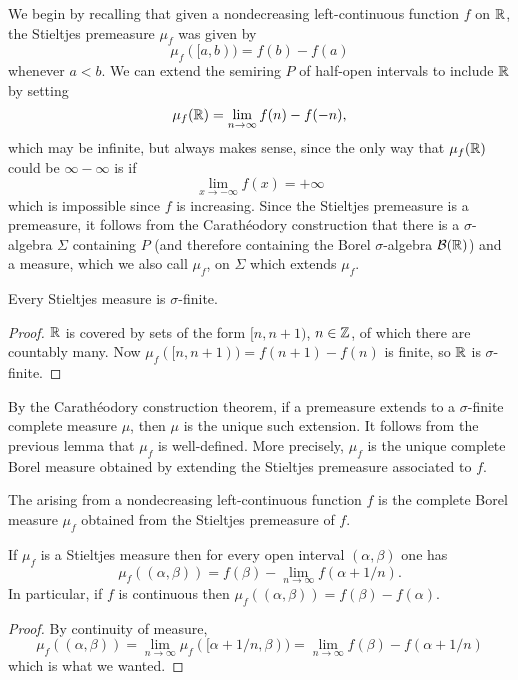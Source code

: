\begin{subsec}
We begin by recalling that given a nondecreasing left-continuous function $f$ on $\mathbb{R}$, the Stieltjes premeasure $\mu_f$ was given by
\[\mu_f([a, b)) = f(b) - f(a)\]
whenever $a < b$.
We can extend the semiring $P$ of half-open intervals to include $\mathbb{R}$ by setting
\[\mu_f(\mathbb{R}) = \lim_{n \to \infty} f(n) - f(-n),\]
which may be infinite, but always makes sense, since the only way that $\mu_f(\mathbb{R})$ could be $\infty - \infty$ is if
\[\lim_{x \to -\infty} f(x) = +\infty\]
which is impossible since $f$ is increasing.
Since the Stieltjes premeasure is a premeasure, it follows from the Carathéodory construction that there is a $\sigma$-algebra $\Sigma$ containing $P$ (and therefore containing the Borel $\sigma$-algebra $\mathcal B(\mathbb{R})$) and a measure, which we also call $\mu_f$, on $\Sigma$ which extends $\mu_f$.
\end{subsec}

\begin{lemma}
Every Stieltjes measure is $\sigma$-finite.
\end{lemma}
\begin{proof}
$\mathbb{R}$ is covered by sets of the form $[n, n + 1)$, $n \in \mathbb{Z}$, of which there are countably many.
Now $\mu_f([n, n + 1)) = f(n+1) - f(n)$ is finite, so $\mathbb{R}$ is $\sigma$-finite.
\end{proof}

\begin{subsec}
By the Carathéodory construction theorem, if a premeasure extends to a $\sigma$-finite complete measure $\mu$, then $\mu$ is the unique such extension.
It follows from the previous lemma that $\mu_f$ is well-defined.
More precisely, $\mu_f$ is the unique complete Borel measure obtained by extending the Stieltjes premeasure associated to $f$.
\end{subsec}

\begin{definition}
The  arising from a nondecreasing left-continuous function $f$ is the complete Borel measure $\mu_f$ obtained from the Stieltjes premeasure of $f$.
\end{definition}

\begin{lemma}
If $\mu_f$ is a Stieltjes measure then for every open interval $(\alpha, \beta)$ one has
\[\mu_f((\alpha, \beta)) = f(\beta) - \lim_{n \to \infty} f(\alpha + 1/n).\]
In particular, if $f$ is continuous then $\mu_f((\alpha, \beta)) = f(\beta) - f(\alpha)$.
\end{lemma}
\begin{proof}
By continuity of measure,
\[\mu_f((\alpha, \beta)) = \lim_{n \to \infty} \mu_f([\alpha + 1/n, \beta)) = \lim_{n \to \infty} f(\beta) - f(\alpha + 1/n)\]
which is what we wanted.
\end{proof}


